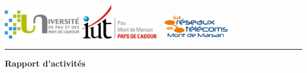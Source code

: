 \begin{sloppypar}
\pagestyle{empty}


\newcommand\titreDocument{\bfseries Rapport d'activités}
\newcommand\poste{Apprenti Administrateur Systèmes et Réseaux en alternance}
\newcommand\auteurDocument{Alexis Déhu}
\newcommand\dateRendu{\bfseries le 31 Mai 2024}
\newcommand\nomResponsable{M. Éric Pierre-Sala}
\newcommand\nomTuteur{M. Guillaume Devesa}
\newcommand\nomEnseignantReferant{M. Angel Abénia}
\newcommand\nomFormation{BUT Réseaux et Télécommunications parcours Cybersécurité, 2ème année}
\newcommand\nomEntreprise{ADITU, Technopole Izarbel Côte Basque, 64210 Bidart}

\begin{titlepage}
   \begin{center}

        \vspace*{2cm}

        \href{https://www.univ-pau.fr/}{\includegraphics[width=0.25\textwidth]{images/logo/uppa.png}}
        \quad \quad
        \href{https://iutpa.univ-pau.fr/fr/index.html}{\includegraphics[width=0.25\textwidth]{images/logo/iut.jpg}}
        \quad
        \href{https://iutpa.univ-pau.fr/fr/l-iut/nos-campus/campus-de-mont-de-marsan.html}{\includegraphics[width=0.25\textwidth]{images/logo/mdm.png}}\\

        \noindent\rule[0.25\baselineskip]{\textwidth}{1pt}

        \vspace{0.5 cm} 

        \Huge{\titreDocument} 


\end{center}
\end{titlepage}
\end{sloppypar}
